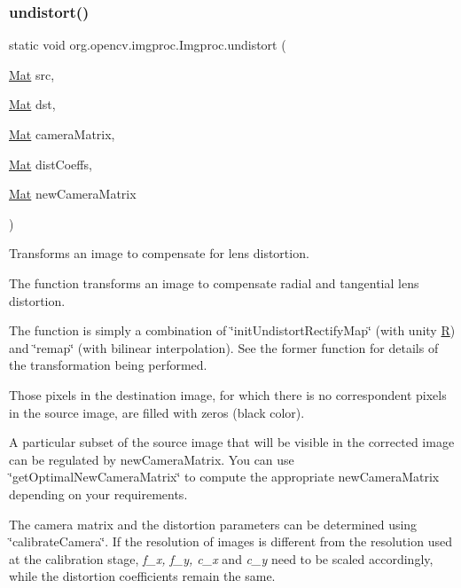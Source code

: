\subsubsection{\texorpdfstring{undistort()}{undistort()}\hspace{0.1cm}{\footnotesize\ttfamily [1/2]}}
{\footnotesize\ttfamily static void org.\+opencv.\+imgproc.\+Imgproc.\+undistort (\begin{DoxyParamCaption}\item[{\mbox{\hyperlink{classorg_1_1opencv_1_1core_1_1_mat}{Mat}}}]{src,  }\item[{\mbox{\hyperlink{classorg_1_1opencv_1_1core_1_1_mat}{Mat}}}]{dst,  }\item[{\mbox{\hyperlink{classorg_1_1opencv_1_1core_1_1_mat}{Mat}}}]{camera\+Matrix,  }\item[{\mbox{\hyperlink{classorg_1_1opencv_1_1core_1_1_mat}{Mat}}}]{dist\+Coeffs,  }\item[{\mbox{\hyperlink{classorg_1_1opencv_1_1core_1_1_mat}{Mat}}}]{new\+Camera\+Matrix }\end{DoxyParamCaption})\hspace{0.3cm}{\ttfamily [static]}}

Transforms an image to compensate for lens distortion.

The function transforms an image to compensate radial and tangential lens distortion.

The function is simply a combination of \char`\"{}init\+Undistort\+Rectify\+Map\char`\"{} (with unity {\ttfamily \mbox{\hyperlink{classorg_1_1opencv_1_1_r}{R}}}) and \char`\"{}remap\char`\"{} (with bilinear interpolation). See the former function for details of the transformation being performed.

Those pixels in the destination image, for which there is no correspondent pixels in the source image, are filled with zeros (black color).

A particular subset of the source image that will be visible in the corrected image can be regulated by {\ttfamily new\+Camera\+Matrix}. You can use \char`\"{}get\+Optimal\+New\+Camera\+Matrix\char`\"{} to compute the appropriate {\ttfamily new\+Camera\+Matrix} depending on your requirements.

The camera matrix and the distortion parameters can be determined using \char`\"{}calibrate\+Camera\char`\"{}. If the resolution of images is different from the resolution used at the calibration stage, {\itshape f\+\_\+x, f\+\_\+y, c\+\_\+x} and {\itshape c\+\_\+y} need to be scaled accordingly, while the distortion coefficients remain the same.


